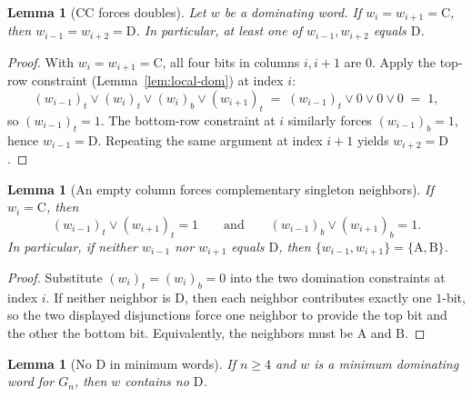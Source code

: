 \documentclass[11pt]{article}
\theoremstyle{plain}
\newtheorem{lemma}[theorem]{Lemma}
\theoremstyle{definition}
\theoremstyle{remark}
\newcommand{\colA}{\mathrm{A}}
\newcommand{\colB}{\mathrm{B}}
\newcommand{\colC}{\mathrm{C}}
\newcommand{\colD}{\mathrm{D}}
\begin{document}
\begin{lemma}[$\colC\colC$ forces doubles]\label{lem:CC-forces-D}
Let $w$ be a dominating word. If $w_i=w_{i+1}=\colC$, then $w_{i-1}=w_{i+2}=\colD$.
In particular, at least one of $w_{i-1},w_{i+2}$ equals $\colD$.
\end{lemma}

\begin{proof}
With $w_i=w_{i+1}=\colC$, all four bits in columns $i,i+1$ are $0$.
Apply the top-row constraint (Lemma~\ref{lem:local-dom}) at index $i$:
\[
(w_{i-1})_t \vee (w_i)_t \vee (w_i)_b \vee (w_{i+1})_t
\;=\; (w_{i-1})_t \vee 0 \vee 0 \vee 0 \;=\;1,
\]
so $(w_{i-1})_t=1$. The bottom-row constraint at $i$ similarly forces $(w_{i-1})_b=1$,
hence $w_{i-1}=\colD$. Repeating the same argument at index $i+1$ yields $w_{i+2}=\colD$.
\end{proof}

\begin{lemma}[An empty column forces complementary singleton neighbors]\label{lem:C-forces}
If $w_i=\colC$, then
\[
(w_{i-1})_t\vee(w_{i+1})_t=1
\qquad\text{and}\qquad
(w_{i-1})_b\vee(w_{i+1})_b=1.
\]
In particular, if neither $w_{i-1}$ nor $w_{i+1}$ equals $\colD$, then
$\{w_{i-1},w_{i+1}\}=\{\colA,\colB\}$.
\end{lemma}

\begin{proof}
Substitute $(w_i)_t=(w_i)_b=0$ into the two domination constraints at index $i$.
If neither neighbor is $\colD$, then each neighbor contributes exactly one $1$-bit,
so the two displayed disjunctions force one neighbor to provide the top bit and
the other the bottom bit. Equivalently, the neighbors must be $\colA$ and $\colB$.
\end{proof}

\begin{lemma}[No $\colD$ in minimum words]\label{lem:no-D}
If $n\ge4$ and $w$ is a minimum dominating word for $G_n$, then $w$ contains no $\colD$.
\end{lemma}
\end{document}
